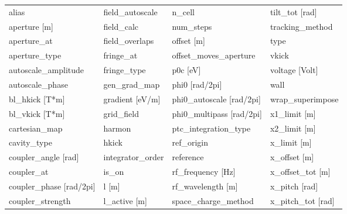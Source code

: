  \begin{tabular}{llll} \toprule
alias                            & field_autoscale                  & n_cell                           & tilt_tot [rad]                   \\
aperture [m]                     & field_calc                       & num_steps                        & tracking_method                  \\
aperture_at                      & field_overlaps                   & offset [m]                       & type                             \\
aperture_type                    & fringe_at                        & offset_moves_aperture            & vkick                            \\
autoscale_amplitude              & fringe_type                      & p0c [eV]                         & voltage [Volt]                   \\
autoscale_phase                  & gen_grad_map                     & phi0 [rad/2pi]                   & wall                             \\
bl_hkick [T*m]                   & gradient [eV/m]                  & phi0_autoscale [rad/2pi]         & wrap_superimpose                 \\
bl_vkick [T*m]                   & grid_field                       & phi0_multipass [rad/2pi]         & x1_limit [m]                     \\
cartesian_map                    & harmon                           & ptc_integration_type             & x2_limit [m]                     \\
cavity_type                      & hkick                            & ref_origin                       & x_limit [m]                      \\
coupler_angle [rad]              & integrator_order                 & reference                        & x_offset [m]                     \\
coupler_at                       & is_on                            & rf_frequency [Hz]                & x_offset_tot [m]                 \\
coupler_phase [rad/2pi]          & l [m]                            & rf_wavelength [m]                & x_pitch [rad]                    \\
coupler_strength                 & l_active [m]                     & space_charge_method              & x_pitch_tot [rad]                \\

\end{tabular}
